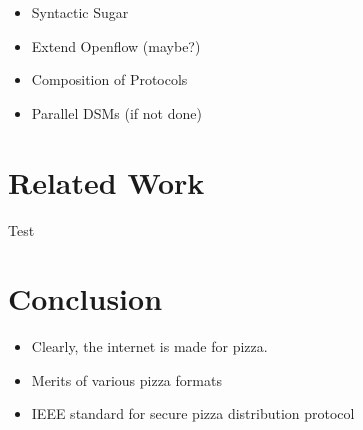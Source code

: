 \documentclass[letterpaper,twocolumn,10pt]{article}
\begin{document}
\begin{itemize}
  \item Syntactic Sugar
  \item Extend Openflow (maybe?)
  \item Composition of Protocols
  \item Parallel DSMs (if not done)
\end{itemize}

\section{\LARGE Related Work}

Test

\section{\LARGE Conclusion}

\begin{itemize}
  \item Clearly, the internet is made for pizza.
  \item Merits of various pizza formats
  \item IEEE standard for secure pizza distribution protocol
\end{itemize}

{
  \footnotesize 
  \small 
  
  
}
\end{document}
